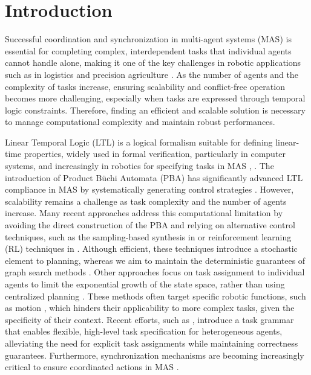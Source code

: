 
\section{Introduction} \label{sec:introduction}
Successful coordination and synchronization in multi-agent systems (MAS) is essential for completing complex, interdependent tasks that individual agents cannot handle alone,  making it one of the key challenges in robotic applications such as in logistics \cite{logistics} and precision agriculture \cite{agriculture}. As the number of agents and the complexity of tasks increase, ensuring scalability and conflict-free operation becomes more challenging, especially when tasks are expressed through temporal logic constraints. Therefore, finding an efficient and scalable solution is necessary to manage computational complexity and maintain robust performances. 
\par Linear Temporal Logic (LTL) is a logical formalism suitable for defining linear-time properties, widely used in formal verification, particularly in computer systems, and increasingly in robotics for specifying tasks in MAS \cite{ltl_planner_3}, \cite{multiagentltl1}. The introduction of Product B\"{u}chi Automata (PBA) has significantly advanced LTL compliance in MAS by systematically generating control strategies \cite{model-checking}. However, scalability remains a challenge as task complexity and the number of agents increase. Many recent approaches address this computational limitation by avoiding the direct construction of the PBA and relying on alternative control techniques, such as the sampling-based synthesis in \cite{large-scale, stylus} or reinforcement learning (RL) techniques in \cite{RL}. Although efficient, these techniques introduce a stochastic element to planning, whereas we aim to maintain the deterministic guarantees of graph search methods \cite{model-checking}. Other approaches focus on task assignment to individual agents to limit the exponential growth of the state space, rather than using centralized planning \cite{decentralized}. These methods often target specific robotic functions, such as motion \cite{motion2}, which hinders their applicability to more complex tasks, given the specificity of their context. Recent efforts, such as \cite{scratches}, introduce a task grammar that enables flexible, high-level task specification for heterogeneous agents, alleviating the need for explicit task assignments while maintaining correctness guarantees. Furthermore, synchronization mechanisms are becoming increasingly critical to ensure coordinated actions in MAS \cite{synchronization}.
